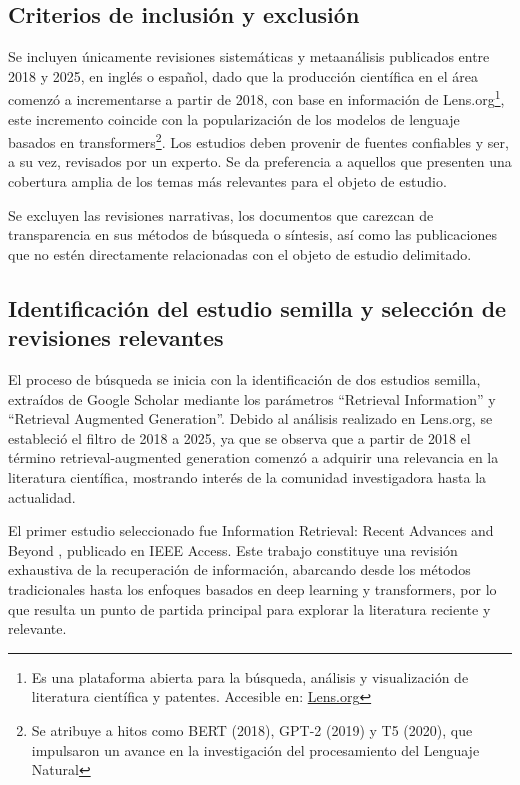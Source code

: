 \subsection{Criterios de inclusión y exclusión}
\label{subsec:criterios-inclusion-exclusion}
Se incluyen únicamente revisiones sistemáticas y metaanálisis publicados entre 2018 y 2025, en inglés o español, dado que la producción 
científica en el área comenzó a incrementarse a partir de 2018, con base en información de Lens.org\footnote{Es una plataforma abierta
para la búsqueda, análisis y visualización de literatura científica y patentes. Accesible en: \href{https://www.lens.org/}{Lens.org}}, este incremento coincide
con la popularización 
de los modelos de lenguaje basados en transformers\footnote{Se atribuye a hitos como BERT (2018), GPT-2 (2019) y T5 (2020), que impulsaron un avance 
en la investigación del procesamiento del Lenguaje Natural}.
Los estudios deben provenir de fuentes confiables y ser, a su vez, revisados por 
un experto. Se da preferencia a aquellos que presenten una cobertura amplia de los temas más relevantes para el objeto de estudio.  

Se excluyen las revisiones narrativas, los documentos que carezcan de transparencia en sus métodos de búsqueda o síntesis, así como las publicaciones que no estén 
directamente relacionadas con el objeto de estudio delimitado.

\subsection{Identificación del estudio semilla y selección de revisiones relevantes}
\label{subsec:estudio-semilla}
El proceso de búsqueda se inicia con la identificación de dos estudios semilla, extraídos de Google Scholar mediante los parámetros “Retrieval Information” y “Retrieval Augmented Generation”. 
Debido al análisis realizado en Lens.org, se estableció el filtro de 2018 a 2025, ya que se observa que a partir de 2018 el término retrieval-augmented generation 
comenzó a adquirir una relevancia en la literatura científica, mostrando interés de la comunidad investigadora hasta la actualidad.

El primer estudio seleccionado fue Information Retrieval: Recent Advances and Beyond \textcite{hambarde2023ir}, publicado en IEEE Access. 
Este trabajo constituye una revisión exhaustiva de la recuperación de información, abarcando desde los métodos tradicionales hasta los enfoques 
basados en deep learning y transformers, por lo que resulta un punto de partida principal para explorar la literatura reciente y relevante.

